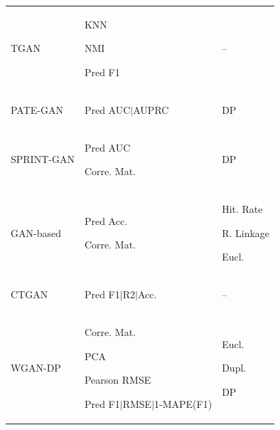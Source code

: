 \begin{landscape}
\begin{table}[htbp]
\begin{tabular}{p{26mm} p{84mm} p{60mm}}
TGAN &	\begin{enumerate*} \item KNN \item NMI \item Pred F1 \end{enumerate*} & --\\

PATE-GAN & \begin{enumerate*} \item  Pred AUC$\vert$AUPRC \end{enumerate*}	& DP \\
SPRINT-GAN & \begin{enumerate*}	\item Pred AUC \item Corre. Mat. \end{enumerate*} &	DP \\

GAN-based &	  \begin{enumerate*} \item Pred Acc. \item Corre. Mat. \end{enumerate*} & \begin{enumerate*} \item Hit. Rate \item R. Linkage  \item Eucl. \end{enumerate*} \\

CTGAN &	\begin{enumerate*} \item Pred F1$\vert$R2$\vert$Acc. \end{enumerate*} &  --\\

WGAN-DP &	\begin{enumerate*} \item Corre. Mat.
 \item PCA \item  Pearson RMSE\newline\item Pred F1$\vert$RMSE$\vert$1-MAPE(F1)  \end{enumerate*}  & \begin{enumerate*} \item Eucl. \item Dupl. \item DP \end{enumerate*}	\\


\end{tabular}
\end{table}
\end{landscape}
